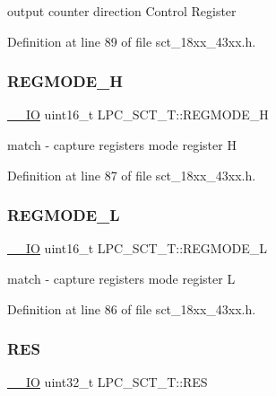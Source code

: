 output counter direction Control Register 

Definition at line 89 of file sct\+\_\+18xx\+\_\+43xx.\+h.

\mbox{\label{struct_l_p_c___s_c_t___t_a5298c5eca1589874e4008c56deb47aa7}} 
\subsubsection{\texorpdfstring{R\+E\+G\+M\+O\+D\+E\+\_\+H}{REGMODE\_H}}
{\footnotesize\ttfamily \hyperlink{core__sc300_8h_aec43007d9998a0a0e01faede4133d6be}{\+\_\+\+\_\+\+IO} uint16\+\_\+t L\+P\+C\+\_\+\+S\+C\+T\+\_\+\+T\+::\+R\+E\+G\+M\+O\+D\+E\+\_\+H}

match -\/ capture registers mode register H 

Definition at line 87 of file sct\+\_\+18xx\+\_\+43xx.\+h.

\mbox{\label{struct_l_p_c___s_c_t___t_ac41593329fa18f6132b3179c42c348b1}} 
\subsubsection{\texorpdfstring{R\+E\+G\+M\+O\+D\+E\+\_\+L}{REGMODE\_L}}
{\footnotesize\ttfamily \hyperlink{core__sc300_8h_aec43007d9998a0a0e01faede4133d6be}{\+\_\+\+\_\+\+IO} uint16\+\_\+t L\+P\+C\+\_\+\+S\+C\+T\+\_\+\+T\+::\+R\+E\+G\+M\+O\+D\+E\+\_\+L}

match -\/ capture registers mode register L 

Definition at line 86 of file sct\+\_\+18xx\+\_\+43xx.\+h.

\mbox{\label{struct_l_p_c___s_c_t___t_a547640aa6901a256bcbb37114b809159}} 
\subsubsection{\texorpdfstring{R\+ES}{RES}}
{\footnotesize\ttfamily \hyperlink{core__sc300_8h_aec43007d9998a0a0e01faede4133d6be}{\+\_\+\+\_\+\+IO} uint32\+\_\+t L\+P\+C\+\_\+\+S\+C\+T\+\_\+\+T\+::\+R\+ES}

